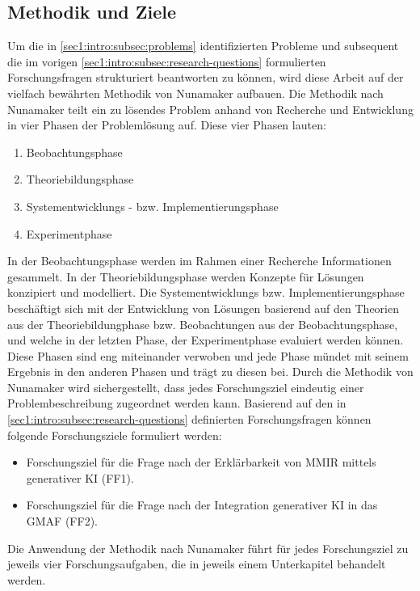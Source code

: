 \subsection{Methodik und Ziele}
\label{sec1:intro:subsec:methodology-goals}
Um die in \cref{sec1:intro:subsec:problems} identifizierten Probleme und subsequent die im vorigen \cref{sec1:intro:subsec:research-questions} formulierten Forschungsfragen strukturiert beantworten zu können, wird diese Arbeit auf der vielfach bewährten Methodik von Nunamaker \cite{nunamaker} aufbauen. 
Die Methodik nach Nunamaker teilt ein zu lösendes Problem anhand von Recherche und Entwicklung in vier Phasen der Problemlösung auf.
\newline
Diese vier Phasen lauten:
\begin{enumerate}
    \setlength{\itemsep}{0pt}
    \item Beobachtungsphase
    \item Theoriebildungsphase
    \item Systementwicklungs - bzw. Implementierungsphase
    \item Experimentphase
\end{enumerate}

In der Beobachtungsphase werden im Rahmen einer Recherche Informationen gesammelt. 
In der Theoriebildungsphase werden Konzepte für Lösungen konzipiert und modelliert. 
Die Systementwicklungs bzw. Implementierungsphase beschäftigt sich mit der Entwicklung von Lösungen basierend auf den Theorien aus der Theoriebildungphase bzw. Beobachtungen aus der Beobachtungsphase, und welche in der letzten Phase, der Experimentphase evaluiert werden können. 
Diese Phasen sind eng miteinander verwoben und jede Phase mündet mit seinem Ergebnis in den anderen Phasen und trägt zu diesen bei. 
Durch die Methodik von Nunamaker wird sichergestellt, dass jedes Forschungsziel eindeutig einer Problembeschreibung zugeordnet werden kann.
Basierend auf den in \cref{sec1:intro:subsec:research-questions} definierten Forschungsfragen können folgende Forschungsziele formuliert werden:
\begin{itemize}
    \item Forschungsziel für die Frage nach der Erklärbarkeit von MMIR mittels generativer KI (FF1).
    \item Forschungsziel für die Frage nach der Integration generativer KI in das GMAF (FF2).
\end{itemize}
\noindent
Die Anwendung der Methodik nach Nunamaker führt für jedes Forschungsziel zu jeweils vier Forschungsaufgaben, die in jeweils einem Unterkapitel behandelt werden.
